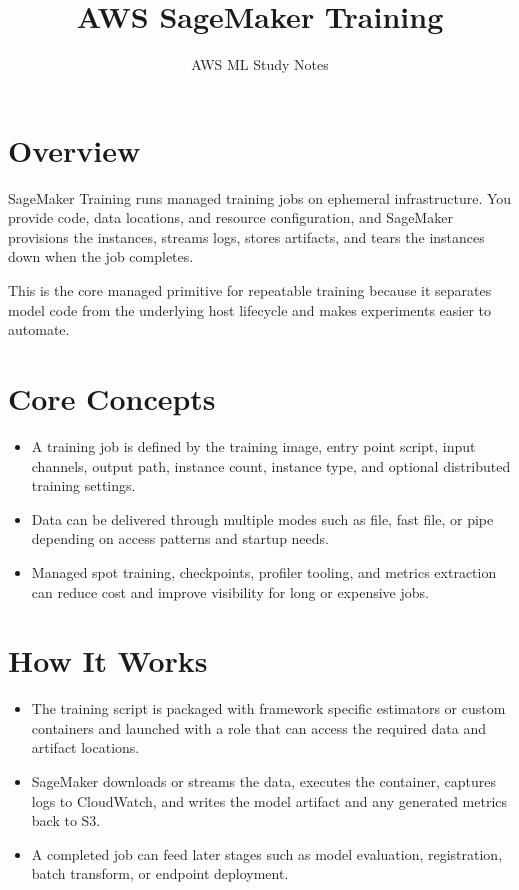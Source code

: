 \documentclass[10pt,twocolumn]{article}
\begin{document}
\title{\vspace{-1.6cm}AWS SageMaker Training}
\author{AWS ML Study Notes}
\date{}
\maketitle
\small

\section*{Overview}
SageMaker Training runs managed training jobs on ephemeral infrastructure. You provide code, data locations, and resource configuration, and SageMaker provisions the instances, streams logs, stores artifacts, and tears the instances down when the job completes.

This is the core managed primitive for repeatable training because it separates model code from the underlying host lifecycle and makes experiments easier to automate.

\section*{Core Concepts}
\begin{itemize}
\item A training job is defined by the training image, entry point script, input channels, output path, instance count, instance type, and optional distributed training settings.
\item Data can be delivered through multiple modes such as file, fast file, or pipe depending on access patterns and startup needs.
\item Managed spot training, checkpoints, profiler tooling, and metrics extraction can reduce cost and improve visibility for long or expensive jobs.
\end{itemize}

\section*{How It Works}
\begin{itemize}
\item The training script is packaged with framework specific estimators or custom containers and launched with a role that can access the required data and artifact locations.
\item SageMaker downloads or streams the data, executes the container, captures logs to CloudWatch, and writes the model artifact and any generated metrics back to S3.
\item A completed job can feed later stages such as model evaluation, registration, batch transform, or endpoint deployment.
\end{itemize}
\end{document}
